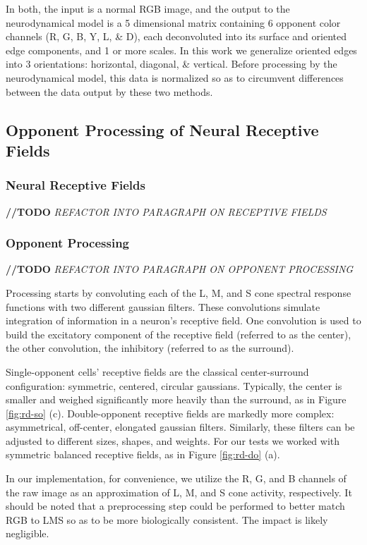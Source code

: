 \documentclass[journal,onecolumn]{IEEEtran}
\begin{document}
In both, the input is a normal RGB image, and the output to the neurodynamical model is a 5 dimensional matrix containing 6 opponent color channels (R, G, B, Y, L, \& D), each deconvoluted into its surface and oriented edge components, and 1 or more scales. In this work we generalize oriented edges into 3 orientations: horizontal, diagonal, \& vertical. Before processing by the neurodynamical model, this data is normalized so as to circumvent differences between the data output by these two methods.

\subsection{Opponent Processing of Neural Receptive Fields}

\subsubsection*{Neural Receptive Fields}

\textbf{//TODO} \textit{REFACTOR INTO PARAGRAPH ON RECEPTIVE FIELDS}

\subsubsection*{Opponent Processing}

\textbf{//TODO} \textit{REFACTOR INTO PARAGRAPH ON OPPONENT PROCESSING}


Processing starts by convoluting each of the L, M, and S cone spectral response functions with two different gaussian filters. These convolutions simulate integration of information in a neuron's receptive field. One convolution is used to build the excitatory component of the receptive field (referred to as the center), the other convolution, the inhibitory (referred to as the surround).

Single-opponent cells' receptive fields are the classical center-surround configuration: symmetric, centered, circular gaussians. Typically, the center is smaller and weighed significantly more heavily than the surround, as in Figure \ref{fig:rd-so} (c). Double-opponent receptive fields are markedly more complex: asymmetrical, off-center, elongated gaussian filters. Similarly, these filters can be adjusted to different sizes, shapes, and weights. For our tests we worked with symmetric balanced receptive fields, as in Figure \ref{fig:rd-do} (a).

In our implementation, for convenience, we utilize the R, G, and B channels of the raw image as an approximation of L, M, and S cone activity, respectively. It should be noted that a preprocessing step could be performed to better match RGB to LMS so as to be more biologically consistent. The impact is likely negligible.
\end{document}
